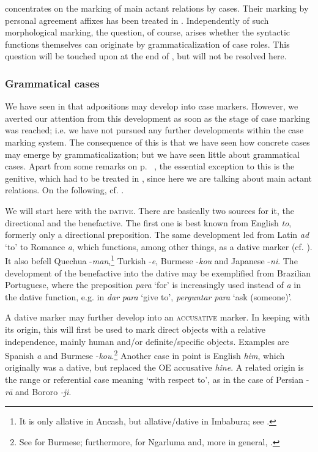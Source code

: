  concentrates on the marking of main actant relations by cases. Their marking by personal agreement affixes has been treated in . Independently of such morphological marking, the question, of course, arises whether the syntactic functions themselves can originate by grammaticalization of case roles. This question will be touched upon at the end of , but will not be resolved here.

\subsubsection{Grammatical cases} \label{sec:3.4.2.2}
We have seen in  that adpositions may develop into case markers. However, we averted our attention from this development as soon as the stage of case marking was reached; i.e. we have not pursued any further developments within the case marking system. The consequence of this is that we have seen how concrete cases may emerge by grammaticalization; but we have seen little about grammatical cases. Apart from some remarks on p.~\pageref{page88}\chk%
 , the essential exception to this is the genitive, which had to be treated in , since here we are talking about main actant relations. On the following, cf. \citet[218]{Givón1979a}.

We will start here with the \textsc{dative}. There are basically two sources for it, the directional and the benefactive. The first one is best known from English \textit{to}, formerly only a directional preposition. The same development led from Latin \textit{ad} ‘to’ to Romance \textit{a}, which functions, among other things, as a dative marker (cf. ). It also befell Quechua -\textit{man},\footnote{It is only allative in Ancash, but allative/dative in Imbabura; see \citet[104]{Cole1982}.} Turkish -\textit{e}, Burmese -\textit{kou} and Japanese -\textit{ni}. The development of the benefactive into the dative may be exemplified from Brazilian Portuguese, where the preposition \textit{para} ‘for’ is increasingly used instead of \textit{a} in the dative function, e.g. in \textit{dar} \textit{para} ‘give to’, \textit{perguntar} \textit{para} ‘ask (someone)’.

A dative marker may further develop into an \textsc{accusative} marker. In keeping with its origin, this will first be used to mark direct objects with a relative independence, mainly human and/or definite/specific objects. Examples are Spanish \textit{a} and Burmese -\textit{kou}.\footnote{See \citet{Kölver1985} for Burmese; furthermore, \citet[99]{Dixon1979} for Ngarluma and, more in general, \citet[48f, 166]{MallinsonEtAl1981}.} Another case in point is English \textit{him}, which originally was a dative, but replaced the OE accusative \textit{hine}. A related origin is the range or referential case meaning ‘with respect to’, as in the case of  Persian -\textit{r\=a} and Bororo \textit{{}-ji}.

